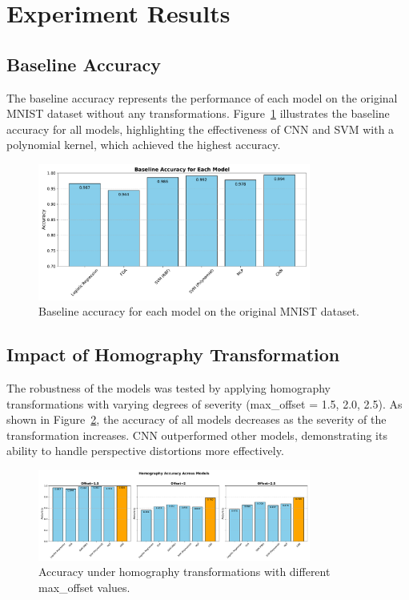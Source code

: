 \documentclass{article}
\begin{document}
\section{Experiment Results}

\subsection{Baseline Accuracy}
The baseline accuracy represents the performance of each model on the original MNIST dataset without any transformations. Figure~\ref{fig:baseline_accuracy} illustrates the baseline accuracy for all models, highlighting the effectiveness of CNN and SVM with a polynomial kernel, which achieved the highest accuracy.

\begin{figure}[h!]
    \centering
    \includegraphics[width=0.8\textwidth]{images/baseline_accuracy.pdf}
    \caption{Baseline accuracy for each model on the original MNIST dataset.}
    \label{fig:baseline_accuracy}
\end{figure}

\subsection{Impact of Homography Transformation}
The robustness of the models was tested by applying homography transformations with varying degrees of severity (max\_offset = 1.5, 2.0, 2.5). As shown in Figure~\ref{fig:homography_accuracy}, the accuracy of all models decreases as the severity of the transformation increases. CNN outperformed other models, demonstrating its ability to handle perspective distortions more effectively.

\begin{figure}[h!]
    \centering
    \includegraphics[width=0.8\textwidth]{images/homography.pdf}
    \caption{Accuracy under homography transformations with different max\_offset values.}
    \label{fig:homography_accuracy}
\end{figure}
\end{document}
